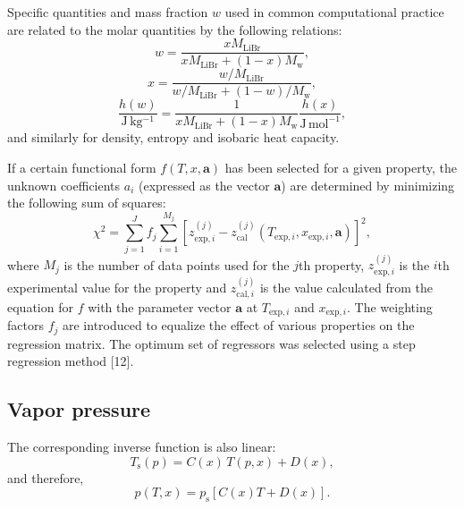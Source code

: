 \documentclass[11pt]{article}
\begin{document}

\noindent Specific quantities and mass fraction $w$ used in common
computational practice are related to the molar quantities by the
following relations:
\begin{equation}
w = \frac{x M_\mathrm{LiBr}}{x M_\mathrm{LiBr} + (1-x)M_\mathrm{w}},
\end{equation}
\begin{equation}
x = \frac{w/M_\mathrm{LiBr}}{w/M_\mathrm{LiBr} + (1-w)/M_\mathrm{w}},
\end{equation}
\begin{equation}
\frac{h(w)}{\mathrm{J\,kg^{-1}}}
 = \frac{1}{x M_\mathrm{LiBr} + (1-x)M_\mathrm{w}}
   \frac{h(x)}{\mathrm{J\,mol^{-1}}},
\end{equation}
and similarly for density, entropy and isobaric heat capacity.


\noindent If a certain functional form $f(T,x,\mathbf{a})$ has been
selected for a given property, the unknown coefficients $a_i$
(expressed as the vector $\mathbf{a}$) are determined by minimizing
the following sum of squares:
\begin{equation}
\chi^{2} = \sum_{j=1}^{J} f_j \sum_{i=1}^{M_j}
  \left[ z^{(j)}_{\mathrm{exp},i}
       - z^{(j)}_{\mathrm{cal}}(T_{\mathrm{exp},i},
         x_{\mathrm{exp},i}, \mathbf{a}) \right]^{2},
\end{equation}
where $M_j$ is the number of data points used for the $j$th property,
$z^{(j)}_{\mathrm{exp},i}$ is the $i$th experimental value for the
property and $z^{(j)}_{\mathrm{cal},i}$ is the value calculated from
the equation for $f$ with the parameter vector $\mathbf{a}$ at
$T_{\mathrm{exp},i}$ and $x_{\mathrm{exp},i}$. The weighting factors
$f_j$ are introduced to equalize the effect of various properties on
the regression matrix. The optimum set of regressors was selected
using a step regression method [12].

\subsection{Vapor pressure}


\noindent The corresponding inverse function is also linear:
\begin{equation}
T_\mathrm{s}(p) = C(x)\,T(p,x) + D(x),
\end{equation}
and therefore,
\begin{equation}
p(T,x) = p_\mathrm{s}\!\left[C(x)T + D(x)\right].
\end{equation}
\end{document}
